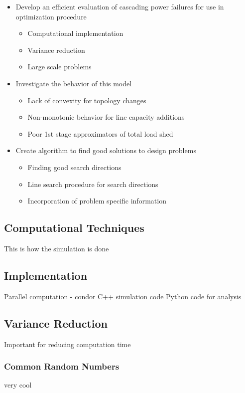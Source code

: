 \begin{itemize}
\item Develop an efficient evaluation of cascading power failures for use in optimization procedure
\begin{itemize}
\item Computational implementation
\item Variance reduction
\item Large scale problems
\end{itemize}
\item Investigate the behavior of this model
\begin{itemize}
\item Lack of convexity for topology changes
\item Non-monotonic behavior for line capacity additions
\item Poor 1st stage approximators of total load shed
\end{itemize}
\item Create algorithm to find good solutions to design problems
\begin{itemize}
\item Finding good search directions
\item Line search procedure for search directions
\item Incorporation of problem specific information
\end{itemize}
\end{itemize}


\subsection{Computational Techniques}

This is how the simulation is done

\subsection*{Implementation}
Parallel computation - condor
C++ simulation code
Python code for analysis

\subsection{Variance Reduction}
Important for reducing computation time
\subsubsection{Common Random Numbers}
very cool
